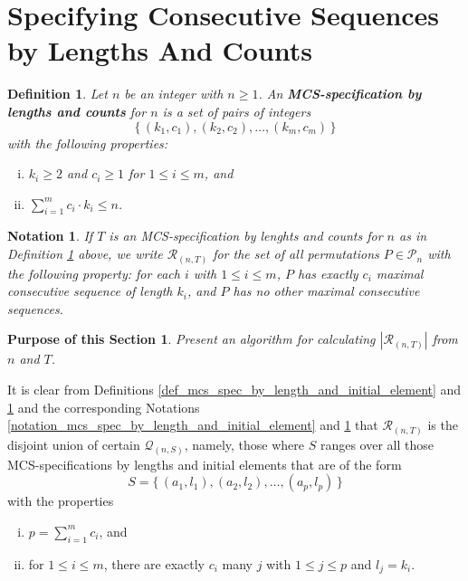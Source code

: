 \documentclass{article}
\newtheorem{definition}[theorem]{Definition}
\newtheorem{notation}[theorem]{Notation}
\newtheorem{purpose}{Purpose of this Section}
\begin{document}
\section{Specifying Consecutive Sequences by Lengths And Counts}

\begin{definition} \label{def_mcs_spec_by_length_and_count}
  Let $n$ be an integer with $n\geq 1$. An {\bf MCS-specification by lengths and counts} for $n$ is a
  set of pairs of integers $$\{\,(k_1, c_1), (k_2, c_2), \ldots,(k_m, c_m)\,\}$$ with the following properties:
  \begin{enumerate}[(i)]
  \item
    $k_i \geq 2$ and $c_i \geq 1$ for $1\leq i \leq m$, and
  \item
    $\sum_{i=1}^m c_i \cdot k_i \leq n$.
  \end{enumerate}
\end{definition}

\begin{notation}\label{notation_mcs_spec_by_length_and_count}
  If $T$ is an MCS-specification by lenghts and counts for $n$ as in
  Definition \ref{def_mcs_spec_by_length_and_count}
  above, we write ${\mathcal R}_{(n,T)}$ for the set of all permutations
  $P \in {\mathcal P}_n$ with the following property: for each $i$ with $1\leq i \leq m$, $P$ has exactly $c_i$
  maximal consecutive sequence of length $k_i$, and $P$ has no other maximal
  consecutive sequences.
\end{notation}

\begin{purpose}
Present an algorithm for calculating $|{\mathcal R}_{(n,T)}|$
from $n$ and $T$.
\end{purpose}

It is clear from Definitions \ref{def_mcs_spec_by_length_and_initial_element}
and \ref{def_mcs_spec_by_length_and_count} and the corresponding Notations
\ref{notation_mcs_spec_by_length_and_initial_element} and \ref{notation_mcs_spec_by_length_and_count} that
${\mathcal R}_{(n,T)}$ is the disjoint union of certain ${\mathcal Q}_{(n,S)}$, namely, those
where $S$ ranges over all those
MCS-specifications by lengths and initial elements that are of the form
$$S = \{\,(a_1, l_1), (a_2, l_2), \ldots,(a_p, l_p)\,\}$$
with the properties
\begin{enumerate}[(i)]
\item
  $p = \sum_{i=1}^m c_i$, and 
\item
  for $1\leq i \leq m$, there are exactly $c_i$ many $j$ with $1\leq j \leq p$ and $l_j = k_i$.
\end{enumerate}
\end{document}
